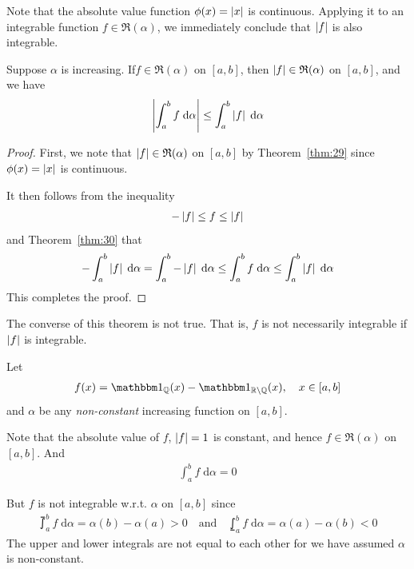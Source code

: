 \documentclass[thmcnt=section, 12pt]{my-elegantbook}
\begin{document}

Note that the absolute value function $\phi(x) = \left\lvert x \right\rvert$ is continuous. Applying it to an integrable function $f \in \mathfrak{R}(\alpha)$, we immediately conclude that $\left\lvert f \right\rvert$ is also integrable.

\begin{theorem} \label{thm:31}
    Suppose $\alpha$ is increasing. If$f \in \mathfrak{R}(\alpha)$ on $[a, b]$, then $\left\lvert f \right\rvert \in \mathfrak{R}(\alpha)$ on $[a, b]$, and we have
    \begin{align}
        \left\lvert \int_{a}^{b} f \; \mathrm{d}\alpha \right\rvert
        \leq \int_{a}^{b} \left\lvert f \right\rvert \; \mathrm{d}\alpha
        \label{eq:76}
    \end{align}
\end{theorem}

\begin{proof}
    First, we note that $\left\lvert f \right\rvert \in \mathfrak{R}(\alpha)$ on $[a, b]$ by Theorem~\ref{thm:29} since $\phi(x) = \left\lvert x \right\rvert$ is continuous.

    It then follows from the inequality
    \begin{align*}
        -\left\lvert f \right\rvert \leq f \leq \left\lvert f \right\rvert
    \end{align*}
    and Theorem~\ref{thm:30} that
    \begin{align*}
        -\int_{a}^{b} \left\lvert f \right\rvert \; \mathrm{d}\alpha
        = \int_{a}^{b} -\left\lvert f \right\rvert \; \mathrm{d}\alpha
        \leq \int_{a}^{b} f \; \mathrm{d}\alpha
        \leq \int_{a}^{b} \left\lvert f \right\rvert \; \mathrm{d}\alpha
    \end{align*}
    This completes the proof.
\end{proof}

The converse of this theorem is not true. That is, $f$ is not necessarily integrable if $\left\lvert f \right\rvert$ is integrable.

\begin{example}
    Let
    \begin{align*}
        f(x) = \ind_{\Q}(x) - \ind_{\R \setminus \Q}(x),
        \quad x \in [a, b]
    \end{align*}
    and $\alpha$ be any \textit{non-constant} increasing function on $[a, b]$.

    Note that the absolute value of $f$, $\left\lvert f \right\rvert = 1$ is constant, and hence $f \in \mathfrak{R}(\alpha)$ on $[a, b]$. And
    \begin{align*}
        \int_{a}^{b} f \; \mathrm{d}\alpha = 0
    \end{align*}

    But $f$ is not integrable w.r.t. $\alpha$ on $[a,b]$ since
    \begin{align*}
        \upint_a^b f \; \mathrm{d}\alpha = \alpha(b) - \alpha(a) > 0
        \quad \text{and} \quad
        \lowint_a^b f \; \mathrm{d}\alpha = \alpha(a) - \alpha(b) < 0
    \end{align*}
    The upper and lower integrals are not equal to each other for we have assumed $\alpha$ is non-constant.
\end{example}
\end{document}
